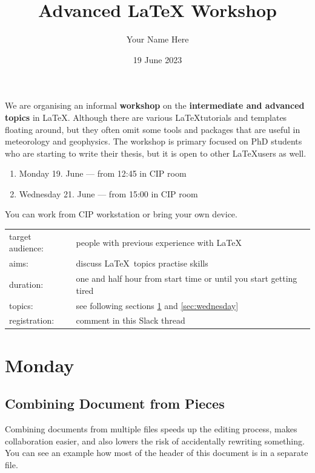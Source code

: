 \documentclass[a4paper,10pt]{report} %
\title{Advanced LaTeX Workshop}
\author{Your Name Here}
\date{19 June 2023}
\begin{document}


 \pagestyle{fancy}
\setcounter{page}{1}

 
 We are organising an informal \textbf{workshop} on the \textbf{intermediate and advanced topics} in \LaTeX.
Although there are various \LaTeX tutorials and templates floating around, but they often omit some tools and packages that are useful in meteorology and geophysics. The workshop is primary focused on PhD students who are starting to write their thesis, but it is open to other \LaTeX users as well.
 \begin{enumerate}
 \item  Monday 19. June --- from 12:45 in CIP room 
 \item  Wednesday 21. June --- from 15:00 in CIP room
\end{enumerate}

\noindent
You can work from CIP workstation or bring your own device.~\\

 \begin{tabular}{l p{}}
   target audience: & people with previous experience with \LaTeX \\
   aims:  & discuss \LaTeX ~topics practise skills \\
   duration: & one and half hour from start time or until you start getting tired \\
   topics: & see following sections \ref{sec:monday} and \ref{sec:wednesday} \\
   registration: & comment in this Slack thread \\ 
 \end{tabular}

 
\section{Monday} \label{sec:monday}




\subsection{Combining Document from Pieces}
Combining documents from multiple files speeds up the editing process, makes collaboration easier, and also lowers the risk of accidentally rewriting something. You can see an example how most of the header of this document is in a separate file.\\
\end{document}
